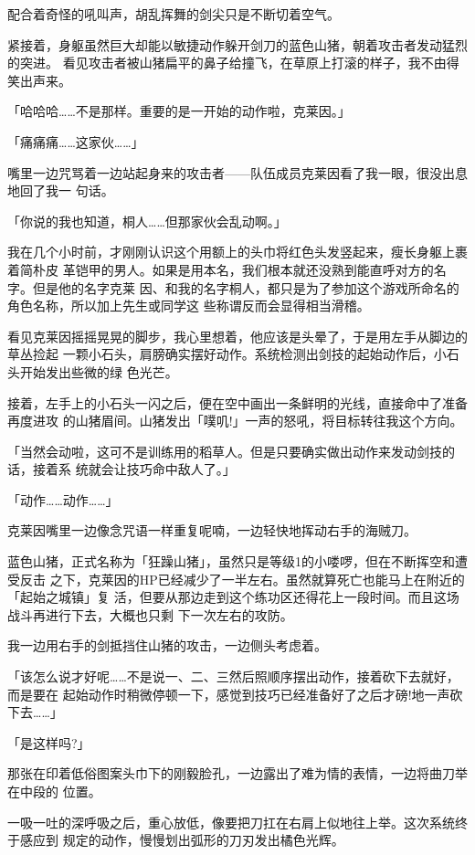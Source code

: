 \documentclass[11pt]{book}
\begin{document}
配合着奇怪的吼叫声，胡乱挥舞的剑尖只是不断切着空气。

紧接着，身躯虽然巨大却能以敏捷动作躲开剑刀的蓝色山猪，朝着攻击者发动猛烈的突进。
看见攻击者被山猪扁平的鼻子给撞飞，在草原上打滚的样子，我不由得笑出声来。

「哈哈哈……不是那样。重要的是一开始的动作啦，克莱因。」

「痛痛痛……这家伙……」

嘴里一边咒骂着一边站起身来的攻击者——队伍成员克莱因看了我一眼，很没出息地回了我一
句话。

「你说的我也知道，桐人……但那家伙会乱动啊。」

我在几个小时前，才刚刚认识这个用额上的头巾将红色头发竖起来，瘦长身躯上裹着简朴皮
革铠甲的男人。如果是用本名，我们根本就还没熟到能直呼对方的名字。但是他的名字克莱
因、和我的名字桐人，都只是为了参加这个游戏所命名的角色名称，所以加上先生或同学这
些称谓反而会显得相当滑稽。

看见克莱因摇摇晃晃的脚步，我心里想着，他应该是头晕了，于是用左手从脚边的草丛捡起
一颗小石头，肩膀确实摆好动作。系统检测出剑技的起始动作后，小石头开始发出些微的绿
色光芒。

接着，左手上的小石头一闪之后，便在空中画出一条鲜明的光线，直接命中了准备再度进攻
的山猪眉间。山猪发出「噗叽!」一声的怒吼，将目标转往我这个方向。

「当然会动啦，这可不是训练用的稻草人。但是只要确实做出动作来发动剑技的话，接着系
统就会让技巧命中敌人了。」

「动作……动作……」

克莱因嘴里一边像念咒语一样重复呢喃，一边轻快地挥动右手的海贼刀。

蓝色山猪，正式名称为「狂躁山猪」，虽然只是等级1的小喽啰，但在不断挥空和遭受反击
之下，克莱因的HP已经减少了一半左右。虽然就算死亡也能马上在附近的「起始之城镇」复
活，但要从那边走到这个练功区还得花上一段时间。而且这场战斗再进行下去，大概也只剩
下一次左右的攻防。

我一边用右手的剑抵挡住山猪的攻击，一边侧头考虑着。

「该怎么说才好呢……不是说一、二、三然后照顺序摆出动作，接着砍下去就好，而是要在
起始动作时稍微停顿一下，感觉到技巧已经准备好了之后才磅!地一声砍下去……」

「是这样吗?」

那张在印着低俗图案头巾下的刚毅脸孔，一边露出了难为情的表情，一边将曲刀举在中段的
位置。

一吸一吐的深呼吸之后，重心放低，像要把刀扛在右肩上似地往上举。这次系统终于感应到
规定的动作，慢慢划出弧形的刀刃发出橘色光辉。
\end{document}
